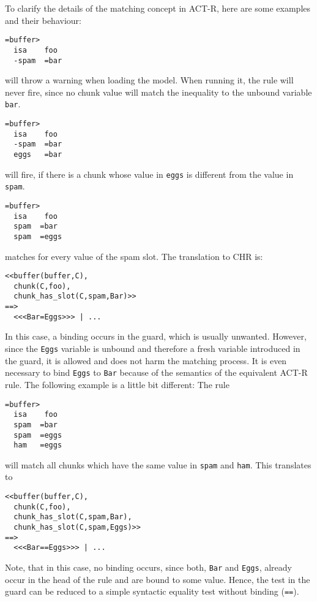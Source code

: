 \begin{example}
To clarify the details of the matching concept in ACT-R, here are some examples and their behaviour:

\begin{lstlisting}
=buffer>
  isa    foo
  -spam  =bar
\end{lstlisting}

will throw a warning when loading the model. When running it, the rule will never fire, since no chunk value will match the inequality to the unbound variable \verb|bar|.

\begin{lstlisting}
=buffer>
  isa    foo
  -spam  =bar
  eggs   =bar
\end{lstlisting}

will fire, if there is a chunk whose value in \verb|eggs| is different from the value in \verb|spam|.

\begin{lstlisting}
=buffer>
  isa    foo
  spam  =bar
  spam  =eggs
\end{lstlisting}

matches for every value of the spam slot. The translation to CHR is:

\begin{lstlisting}
<<buffer(buffer,C),
  chunk(C,foo),
  chunk_has_slot(C,spam,Bar)>>
==>
  <<<Bar=Eggs>>> | ...
\end{lstlisting}

In this case, a binding occurs in the guard, which is usually unwanted. However, since the \verb|Eggs| variable is unbound and therefore a fresh variable introduced in the guard, it is allowed and does not harm the matching process. It is even necessary to bind \verb|Eggs| to \verb|Bar| because of the semantics of the equivalent ACT-R rule. The following example is a little bit different: The rule

\begin{lstlisting}
=buffer>
  isa    foo
  spam  =bar
  spam  =eggs
  ham   =eggs
\end{lstlisting}

will match all chunks which have the same value in \verb|spam| and \verb|ham|. This translates to

\begin{lstlisting}
<<buffer(buffer,C),
  chunk(C,foo),
  chunk_has_slot(C,spam,Bar),
  chunk_has_slot(C,spam,Eggs)>>
==>
  <<<Bar==Eggs>>> | ...
\end{lstlisting}

Note, that in this case, no binding occurs, since both, \verb|Bar| and \verb|Eggs|, already occur in the head of the rule and are bound to some value. Hence, the test in the guard can be reduced to a simple syntactic equality test without binding (\verb|==|).

\end{example}

